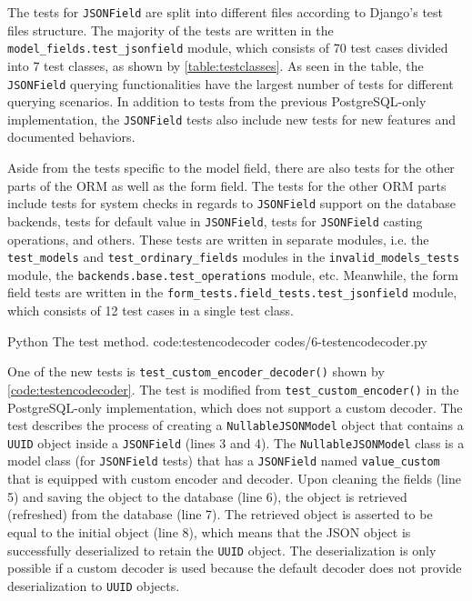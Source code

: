 The tests for \verb|JSONField| are split into different files according to
Django's test files structure. The majority of the tests are written in the
\verb|model_fields.test_jsonfield| module, which consists of 70 test cases
divided into 7 test classes, as shown by \autoref{table:testclasses}. As seen
in the table, the \verb|JSONField| querying functionalities have the largest
number of tests for different querying scenarios. In addition to tests from the
previous PostgreSQL-only implementation, the \verb|JSONField| tests also
include new tests for new features and documented behaviors.

Aside from the tests specific to the model field, there are also tests for the
other parts of the ORM as well as the form field. The tests for the other ORM
parts include tests for system checks in regards to \verb|JSONField| support on
the database backends, tests for default value in \verb|JSONField|, tests for
\verb|JSONField| casting operations, and others. These tests are written in
separate modules, i.e. the \verb|test_models| and \verb|test_ordinary_fields|
modules in the \verb|invalid_models_tests| module, the
\verb|backends.base.test_operations| module, etc. Meanwhile, the form field
tests are written in the \verb|form_tests.field_tests.test_jsonfield| module,
which consists of 12 test cases in a single test class.

\listing
{Python}
{The  test method.}
{code:testencodecoder}
{codes/6-testencodecoder.py}

One of the new tests is \verb|test_custom_encoder_decoder()| shown by
\autoref{code:testencodecoder}. The test is modified from
\verb|test_custom_encoder()| in the PostgreSQL-only implementation, which does
not support a custom decoder. The test describes the process of creating a
\verb|NullableJSONModel| object that contains a \verb|UUID| object inside a
\verb|JSONField| (lines 3 and 4). The \verb|NullableJSONModel| class is a model
class (for \verb|JSONField| tests) that has a \verb|JSONField| named
\verb|value_custom| that is equipped with custom encoder and decoder.  Upon
cleaning the fields (line 5) and saving the object to the database (line 6),
the object is retrieved (refreshed) from the database (line 7). The retrieved
object is asserted to be equal to the initial object (line 8), which means that
the JSON object is successfully deserialized to retain the \verb|UUID| object.
The deserialization is only possible if a custom decoder is used because the
default decoder does not provide deserialization to \verb|UUID| objects.

